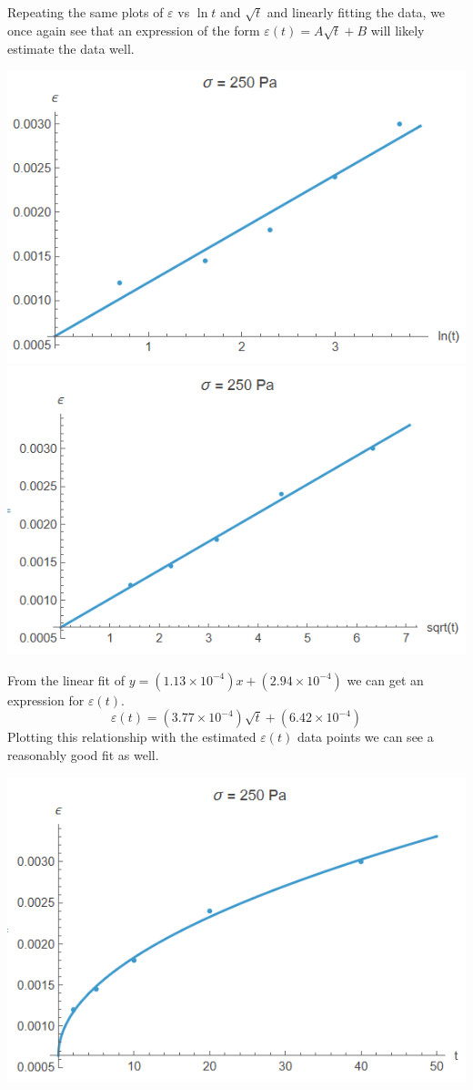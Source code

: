 \documentclass[preprint,12pt,authoryear]{elsarticle}
\begin{document}
Repeating the same plots of $\varepsilon$ vs $\ln{t}$ and $\sqrt{t}$ and linearly fitting the data, we once again see that an expression of the form $\varepsilon(t) = A\sqrt{t}+B$ will likely estimate the data well.

\includegraphics[scale=0.5]{Dawson-figures/250-ln.png}
\includegraphics[scale=0.5]{Dawson-figures/250-sqrt.png}

From the linear fit of $y = (1.13 \times10^{-4})x + (2.94 \times 10^{-4})$ we can get an expression for $\varepsilon(t)$.
\begin{equation}
    \varepsilon(t) =(3.77 \times10^{-4})\sqrt{t}+(6.42 \times 10^{-4})
\end{equation}
Plotting this relationship with the estimated $\varepsilon(t)$ data points we can see a reasonably good fit as well.

\includegraphics[scale=0.5]{Dawson-figures/250-full.png}
\end{document}
